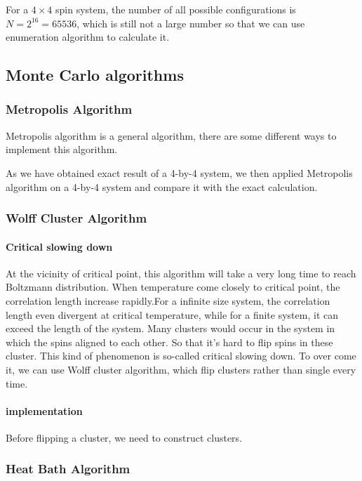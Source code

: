 \documentclass{article}
\begin{document}
For a $4\times 4$ spin system, the number of all possible configurations is $N=2^16=65536$, which is still not a large number so that we can use enumeration algorithm to calculate it.


\subsection{Monte Carlo algorithms}

\subsubsection{Metropolis Algorithm}
Metropolis algorithm is a general algorithm, there are some different ways to implement this algorithm. 

As we have obtained exact result of a 4-by-4 system, we then applied Metropolis algorithm on a 4-by-4 system and compare it with the exact calculation.


\subsubsection{Wolff Cluster Algorithm}
\paragraph{Critical slowing down}
At the vicinity of critical point, this algorithm will take a very long time to reach Boltzmann distribution. When
temperature come closely to critical point, the correlation length increase rapidly.For a infinite size system, the correlation length even divergent at critical temperature, while for a finite system, it can exceed the length of the system.  Many clusters would occur in the system in which the spins aligned to each other. So that it's hard to flip spins in these cluster. This kind of phenomenon is so-called critical slowing down. To over come it, we can use Wolff cluster algorithm, which flip clusters rather than single every time.
\paragraph{implementation}
Before flipping a cluster, we need to construct clusters.

\subsubsection{Heat Bath Algorithm}
\end{document}
